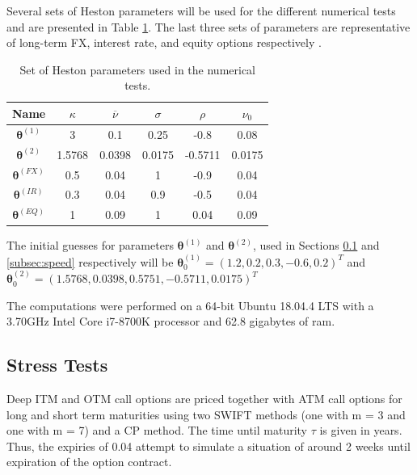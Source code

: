 \documentclass[12,twoside]{mammeTFM}
\theoremstyle{definition}
\theoremstyle{remark}
\begin{document}
Several sets of Heston parameters will be used for the different numerical tests and are presented in Table \ref{table:heston_params}. The last three sets of parameters are representative of long-term FX, interest rate, and equity options respectively \cite{and08}.

\begin{table}[h]
\begin{center}
 \begin{tabular}{|c | c | c | c | c | c |} 
 \hline
 Name & $\kappa$ & $\overline{\nu}$ & $\sigma$ & $\rho$ & $\nu_0$ \\ [0.5ex] 
 \hline
 $\boldsymbol{\theta}^{(1)}$ & 3 & 0.1 & 0.25 & -0.8 & 0.08 \\ 
 \hline
 $\boldsymbol{\theta}^{(2)}$ & 1.5768 & 0.0398 & 0.0175 & -0.5711 & 0.0175 \\ 
 \hline
 $\boldsymbol{\theta}^{(FX)}$ & 0.5 & 0.04 & 1 & -0.9 & 0.04 \\ 
 \hline
 $\boldsymbol{\theta}^{(IR)}$ & 0.3 & 0.04 & 0.9 & -0.5 & 0.04 \\ 
 \hline
 $\boldsymbol{\theta}^{(EQ)}$ & 1 & 0.09 & 1 & 0.04 & 0.09 \\ 
 \hline
\end{tabular}
\end{center}
\caption{Set of Heston parameters used in the numerical tests.}\label{table:heston_params}
\end{table}

The initial guesses for parameters $\boldsymbol{\theta}^{(1)}$ and $\boldsymbol{\theta}^{(2)}$, used in Sections \ref{subsec:stress} and \ref{subsec:speed} respectively will be $\boldsymbol{\theta}^{(1)}_{0} = (1.2, 0.2, 0.3, -0.6, 0.2)^{T}$ and $\boldsymbol{\theta}^{(2)}_{0} = (1.5768, 0.0398, 0.5751, -0.5711, 0.0175)^{T}$

The computations were performed on a 64-bit Ubuntu 18.04.4 LTS with a 3.70GHz Intel Core i7-8700K processor and 62.8 gigabytes of ram.
\subsection{Stress Tests}\label{subsec:stress}

Deep ITM and OTM call options are priced together with ATM call options for long and short term maturities using two SWIFT methods (one with m = 3 and one with m = 7) and a CP method. The time until maturity $\tau$ is given in years. Thus, the expiries of 0.04 attempt to simulate a situation of around 2 weeks until expiration of the option contract.
\end{document}
